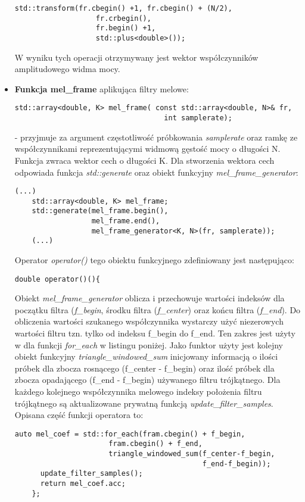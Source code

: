 \begin{itemize}
\begin{lstlisting}[style=lst:cpp]
    std::transform(fr.cbegin() +1, fr.cbegin() + (N/2),
                   fr.crbegin(),
                   fr.begin() +1,
                   std::plus<double>());
\end{lstlisting}
W wyniku tych operacji otrzymywany jest wektor współczynników amplitudowego widma mocy.

\item{\textbf{Funkcja mel\_frame} aplikująca filtry melowe:
 \begin{lstlisting}[style=lst:cpp]
  std::array<double, K> mel_frame( const std::array<double, N>& fr,
                                   int samplerate);
\end{lstlisting}
}
- przyjmuje za argument częstotliwość próbkowania \textit{samplerate} oraz ramkę ze współczynnikami reprezentującymi widmową gęstość mocy o długości N. Funkcja zwraca wektor cech o długości K. Dla stworzenia wektora cech odpowiada funkcja \textit{std::generate} oraz obiekt funkcyjny \textit{mel\_frame\_generator}:

 \begin{lstlisting}[style=lst:cpp]
    (...)
    std::array<double, K> mel_frame;
    std::generate(mel_frame.begin(),
                  mel_frame.end(),
                  mel_frame_generator<K, N>(fr, samplerate));
    (...)
 \end{lstlisting}

Operator \textit{operator()} tego obiektu funkcyjnego zdefiniowany jest następująco:

 \begin{lstlisting}[style=lst:cpp]
    double operator()(){
 \end{lstlisting}

Obiekt \textit{mel\_frame\_generator} oblicza i przechowuje wartości indeksów dla początku filtra (\textit{f\_begin}, środku filtra (\textit{f\_center}) oraz końcu filtra (\textit{f\_end}). Do obliczenia wartości szukanego współczynnika wystarczy użyć niezerowych wartości filtru tzn. tylko od indeksu f\_begin do f\_end. Ten zakres jest użyty w dla funkcji \textit{for\_each} w listingu poniżej. Jako funktor użyty jest kolejny obiekt funkcyjny \textit{triangle\_windowed\_sum} inicjowany informacją o ilości próbek dla zbocza rosnącego (f\_center - f\_begin) oraz ilość próbek dla zbocza opadającego (f\_end - f\_begin) używanego filtru trójkątnego. Dla każdego kolejnego współczynnika melowego indeksy położenia filtru trójkątnego są aktualizowane prywatną funkcją \textit{update\_filter\_samples}. Opisana część funkcji operatora to: 
 \begin{lstlisting}[style=lst:cpp]
      auto mel_coef = std::for_each(fram.cbegin() + f_begin,
                      fram.cbegin() + f_end,
                      triangle_windowed_sum(f_center-f_begin,
                                            f_end-f_begin));
      update_filter_samples();
      return mel_coef.acc;
    };
 \end{lstlisting}


\end{itemize}

